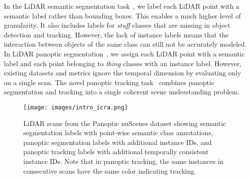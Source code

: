 \documentclass[letterpaper, 10 pt, journal, twoside]{IEEEtran}
\begin{document}
In the LiDAR semantic segmentation task~\cite{thomas2019kpconv,wu2018squeezeseg, milioto2019rangenet++}, we label each LiDAR point with a semantic label rather than bounding boxes. This enables a much higher level of granularity. It also includes labels for \emph{stuff} classes that are missing in object detection and tracking.
However, the lack of instance labels means that the interaction between objects of the same class can still not be accurately modeled.
In LiDAR panoptic segmentation~\cite{behley2019semantickitti, sirohi2021efficientlps}, we assign each LiDAR point with a semantic label and each point belonging to \emph{thing} classes with an instance label. However, existing datasets and metrics ignore the temporal dimension by evaluating only on a single scan.
The novel panoptic tracking task~\cite{hurtado2020mopt} combines panoptic segmentation and tracking into a single coherent scene understanding problem.

\begin{figure}
    \centering
     \texttt{[image: images/intro\_icra.png]}
     \caption{LiDAR scans from the Panoptic nuScenes dataset showing semantic segmentation labels with point-wise semantic class annotations, panoptic segmentation labels with additional instance IDs, and panoptic tracking labels with additional temporally consistent instance IDs. Note that in panoptic tracking, the same instances in consecutive scans have the same color indicating tracking.}
     \label{fig:paper-teaser}
     \vspace{-0.3cm}
\end{figure}
\end{document}
